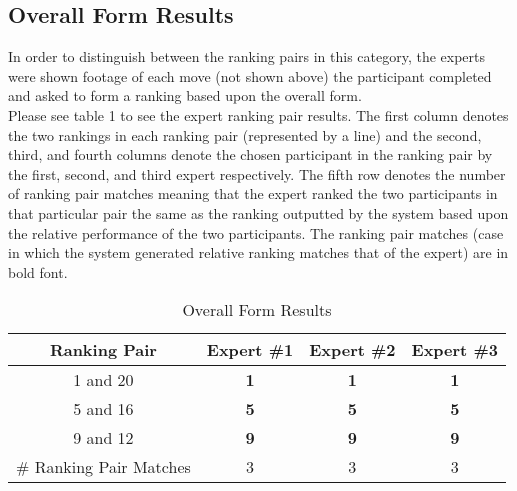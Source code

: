 \subsection{Overall Form Results}
In order to distinguish between the ranking pairs in this category, the experts were shown footage of each move (not shown above) the participant completed and asked to form a ranking based upon the overall form.\\
Please see table 1 to see the expert ranking pair results.  The first column denotes the two rankings in each ranking pair (represented by a line) and the second, third, and fourth columns denote the chosen participant in the ranking pair by the first, second, and third expert respectively.  The fifth row denotes the number of ranking pair matches meaning that the expert ranked the two participants in that particular pair the same as the ranking outputted by the system based upon the relative performance of the two participants. The ranking pair matches (case in which the system generated relative ranking matches that of the expert) are in bold font.\\

\begin{table}[h!]
\caption{Overall Form Results}
\centering
\begin{tabular}{c c c c}
\hline \hline
Ranking Pair & Expert \#1 & Expert \#2 & Expert \#3 \\ [0.5ex]
\hline
1 and 20 &		\textbf{1}&		\textbf{1}&		\textbf{1}\\
5 and 16 &		\textbf{5}&		\textbf{5}&		\textbf{5}\\
9 and 12 &		\textbf{9}&		\textbf{9}&		\textbf{9} \\
\hline
\# Ranking Pair Matches &		3&		3&		3 \\
\end{tabular}
\label{table:overallformresult}
\end{table}

